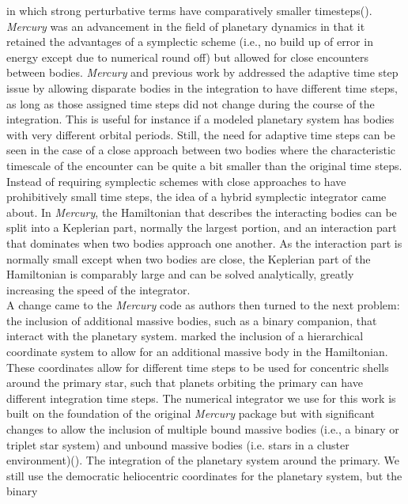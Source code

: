 \documentclass[manuscript]{aastex631}
\begin{document}
in which strong perturbative terms have comparatively smaller timesteps(\cite{dun98}). 
 \textit{Mercury} was an advancement in the field of planetary dynamics in that it retained the advantages of a symplectic scheme 
(i.e., no build up of error in energy except due to numerical round off) but allowed for close encounters between bodies. \textit{Mercury} and previous work by \cite{sah94}
addressed the adaptive time step issue by allowing disparate bodies in the integration to have different time steps, as long as those assigned time steps 
did not change during the course of the integration. This is useful for instance if a modeled planetary system
has bodies with very different orbital periods.
Still, the need for adaptive time steps can be seen in the case of a close approach between
two bodies where the characteristic timescale of the encounter can be quite a bit smaller than the original time steps. Instead of requiring symplectic schemes
with close approaches to have prohibitively small time steps, the idea of a hybrid symplectic integrator came about. In \textit{Mercury}, the Hamiltonian that describes
the interacting bodies can be split into a Keplerian part, normally the largest portion, and an interaction part that dominates when two bodies 
approach one another. As the interaction part is normally small except when two bodies are close, the Keplerian part of the Hamiltonian is comparably large and can be solved
analytically, greatly increasing the speed of the integrator. \\
\indent A change came to the \textit{Mercury} code as authors then turned to the next problem: the inclusion of additional massive bodies, such as a 
binary companion, that interact with the planetary system. \cite{cha02} marked the inclusion of a hierarchical coordinate system
to allow for an additional massive body in the Hamiltonian. These coordinates allow for different time steps to be used for concentric shells around the primary star,
such that planets orbiting the primary can have different integration time steps.
The numerical integrator we use for this work is built on the foundation of the original \textit{Mercury} package but with significant changes
to allow the inclusion of multiple bound massive bodies (i.e., a binary or triplet star system) and unbound massive bodies (i.e. stars in a cluster environment)(\cite{kai17}).
The integration of the planetary system around the primary. We still use the democratic heliocentric coordinates for the planetary system, but the binary
\end{document}
